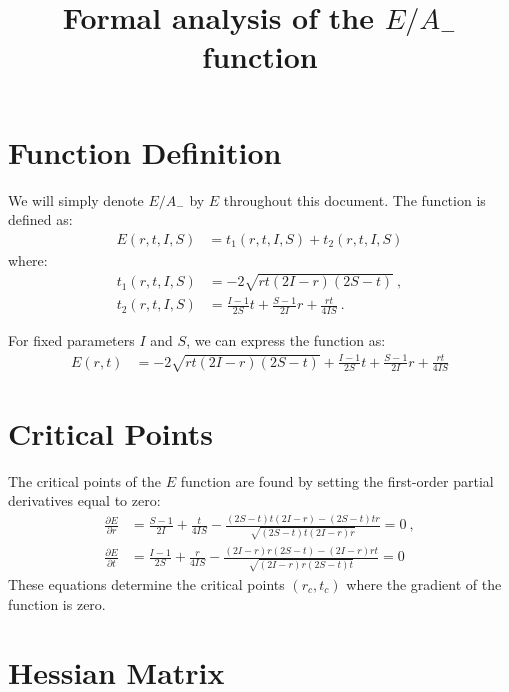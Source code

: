 \documentclass[a4paper]{article}
\title{Formal analysis of the $E/A_{-}$ function}
\author{}
\date{}
\begin{document}
\maketitle

\section{Function Definition}

We will simply denote $E/A_{-}$ by $E$ throughout this document. The function is defined as:
\begin{align}
E(r,t,I,S) &= t_1(r,t,I,S) + t_2(r,t,I,S)
\end{align}
where:
\begin{align}
t_1(r,t,I,S) &= -2\sqrt{rt(2I-r)(2S-t)}\ ,\nonumber \\
t_2(r,t,I,S) &= \frac{I-1}{2S}t + \frac{S-1}{2I}r + \frac{rt}{4IS}\ .
\label{terms}
\end{align}

For fixed parameters $I$ and $S$, we can express the function as:
\begin{align}
E(r,t) &= -2\sqrt{rt(2I-r)(2S-t)} + \frac{I-1}{2S}t + \frac{S-1}{2I}r + \frac{rt}{4IS}
\end{align}

\section{Critical Points}
The critical points of the $E$ function are found by setting the first-order partial derivatives equal to zero:
\begin{align}
\frac{\partial E}{\partial r} &= \frac{S - 1}{2I} + \frac{t}{4IS} - \frac{(2S - t)t(2I - r) - (2S - t)t r}{\sqrt{(2S - t)t(2I - r)r}} = 0\ ,\nonumber\\
\frac{\partial E}{\partial t} &= \frac{I - 1}{2S} + \frac{r}{4IS} - \frac{(2I - r)r(2S - t) - (2I - r)r t}{\sqrt{(2I - r)r(2S - t)t}} = 0
\label{system-eq}
\end{align}
These equations determine the critical points $(r_c, t_c)$ where the gradient of the function is zero.

\section{Hessian Matrix}
\end{document}
